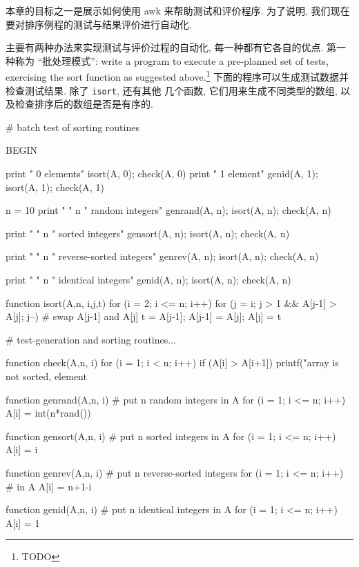 本章的目标之一是展示如何使用 awk 来帮助测试和评价程序. 为了说明, 我们现在
要对排序例程的测试与结果评价进行自动化.

主要有两种办法来实现测试与评价过程的自动化, 每一种都有它各自的优点. 第一 
种称为 ``批处理模式'': write a program to execute a pre-planned set of
tests, exercising the sort function as suggested above.\footnote{TODO}
下面的程序可以生成测试数据并检查测试结果. 除了 \texttt{isort}, 还有其他
几个函数, 它们用来生成不同类型的数组, 以及检查排序后的数组是否是有序的.
\begin{awkcode}
    # batch test of sorting routines

    BEGIN {
        print "    0 elements"
        isort(A, 0); check(A, 0)    
        print "    1 element"
        genid(A, 1); isort(A, 1); check(A, 1)
        
        n = 10
        print "    " n " random integers"
        genrand(A, n); isort(A, n); check(A, n)
        
        print "    " n " sorted integers"
        gensort(A, n); isort(A, n); check(A, n)
        
        print "    " n " reverse-sorted integers"
        genrev(A, n); isort(A, n); check(A, n)
        
        print "    " n " identical integers"
        genid(A, n); isort(A, n); check(A, n)
    }

    function isort(A,n,     i,j,t) {
        for (i = 2; i <= n; i++)
            for (j = i; j > 1 && A[j-1] > A[j]; j--) {
                # swap A[j-1] and A[j]
                t = A[j-1]; A[j-1] = A[j]; A[j] = t
            }
    }

\end{awkcode}
\begin{awkcode}
    # test-generation and sorting routines...

    function check(A,n,   i) {
        for (i = 1; i < n; i++)
            if (A[i] > A[i+1])
                printf("array is not sorted, element %
    }

    function genrand(A,n,  i) { # put n random integers in A
        for (i = 1; i <= n; i++)
            A[i] = int(n*rand())
    }

    function gensort(A,n,  i) { # put n sorted integers in A
        for (i = 1; i <= n; i++)
            A[i] = i
    }

    function genrev(A,n,  i) {  # put n reverse-sorted integers
        for (i = 1; i <= n; i++)  # in A
            A[i] = n+1-i
    }

    function genid(A,n,  i) {   # put n identical integers in A
        for (i = 1; i <= n; i++)
            A[i] = 1
    }
\end{awkcode}

